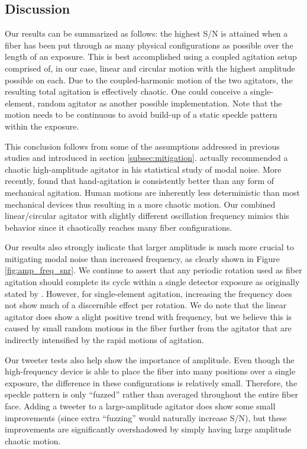 \documentclass[twocolumn]{emulateapj}
\begin{document}
\subsection{Discussion}
\label{subsec:discussion}

Our results can be summarized as follows: the highest S/N is attained when a fiber has been put through as many physical configurations as possible over the length of an exposure. This is best accomplished using a coupled agitation setup comprised of, in our case, linear and circular motion with the highest amplitude possible on each. Due to the coupled-harmonic motion of the two agitators, the resulting total agitation is effectively chaotic. One could conceive a single-element, random agitator as another possible implementation. Note that the motion needs to be continuous to avoid build-up of a static speckle pattern within the exposure.

This conclusion follows from some of the assumptions addressed in previous studies and introduced in section \ref{subsec:mitigation}. \citet{Grupp2003} actually recommended a chaotic high-amplitude agitator in his statistical study of modal noise. More recently, \citet{Lemke2011, McCoy2012, Mahadevan2014, Roy2014} found that hand-agitation is consistently better than any form of mechanical agitation. Human motions are inherently less deterministic than most mechanical devices thus resulting in a more chaotic motion. Our combined linear/circular agitator with slightly different oscillation frequency mimics this behavior since it chaotically reaches many fiber configurations.

Our results also strongly indicate that larger amplitude is much more crucial to mitigating modal noise than increased frequency, as clearly shown in Figure \ref{fig:amp_freq_snr}. We continue to assert that any periodic rotation used as fiber agitation should complete its cycle within a single detector exposure as originally stated by \citet{Baudrand2001}. However, for single-element agitation, increasing the frequency does not show much of a discernible effect per rotation. We do note that the linear agitator does show a slight positive trend with frequency, but we believe this is caused by small random motions in the fiber further from the agitator that are indirectly intensified by the rapid motions of agitation.

Our tweeter tests also help show the importance of amplitude. Even though the high-frequency device is able to place the fiber into many positions over a single exposure, the difference in these configurations is relatively small. Therefore, the speckle pattern is only ``fuzzed'' rather than averaged throughout the entire fiber face. Adding a tweeter to a large-amplitude agitator does show some small improvements (since extra ``fuzzing'' would naturally increase S/N), but these improvements are significantly overshadowed by simply having large amplitude chaotic motion.
\end{document}
